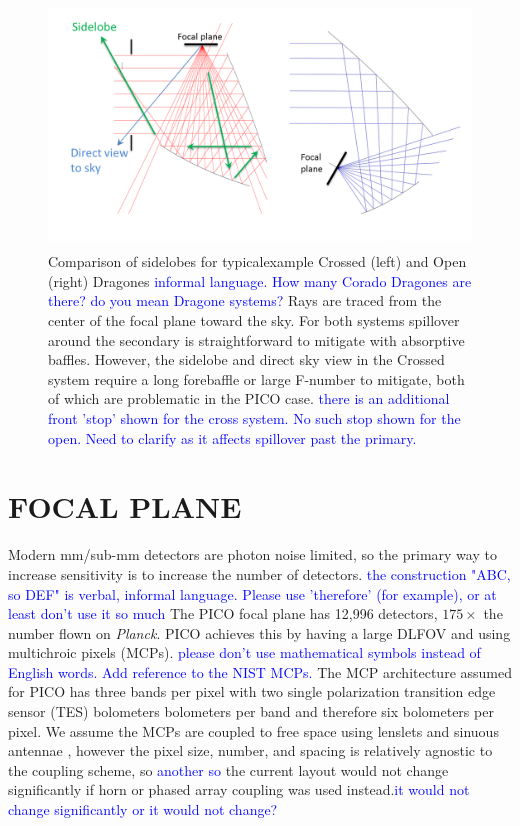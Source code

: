 \documentclass[]{spie}  %
\newcommand{\comb}[1]{\textcolor{blue}{#1}}
\begin{document}
\begin{figure} [ht]
\begin{center}
\includegraphics[height=6.5cm]{sidelobes.png}
\end{center}
\caption { \label{fig:sidelobes} 
Comparison of sidelobes for typicalexample Crossed (left) and Open (right) Dragones \comb{informal language. How many Corado Dragones are there? do you mean Dragone systems?}  Rays are traced from the center 
of the focal plane toward the sky.
For both systems spillover around the secondary is straightforward to mitigate with absorptive baffles.  However, the sidelobe and direct 
sky view in the Crossed system require a long forebaffle or large F-number to mitigate, both of which are problematic in the PICO case.
\comb{there is an additional front 'stop' shown for the cross system. No such stop shown for the open. Need to clarify as it affects 
spillover past the primary.}
}
\end{figure} 


%
%

\section{FOCAL PLANE}
\label{sec:focalplane}

Modern mm/sub-mm detectors are photon noise limited, so the primary way to increase sensitivity is to increase the number of detectors. 
\comb{the construction "ABC, so DEF" is verbal, informal language. Please use 'therefore' (for example), or at least don't use it so much}
The PICO focal plane has 12,996 detectors, $175\times$ the number flown on \textit{Planck}. PICO achieves this by 
having a large DLFOV and using multichroic pixels (MCPs)\cite{Suzuki2014_samps}. \comb{ please don't use 
mathematical symbols instead of English words. Add reference to the NIST MCPs.} 
The MCP architecture assumed for PICO has three bands per pixel with two single polarization transition 
edge sensor (TES) bolometers bolometers per band and therefore six bolometers per pixel. 
We assume the MCPs are coupled to free space using lenslets and sinuous antennae \cite{Suzuki2014_samps}, 
however the pixel size, number, and spacing is 
relatively agnostic to the coupling scheme, so \comb{another so} the current layout would not change significantly 
if horn or phased array coupling was used instead.\comb{it would not change significantly or it would not change?}
\end{document}
